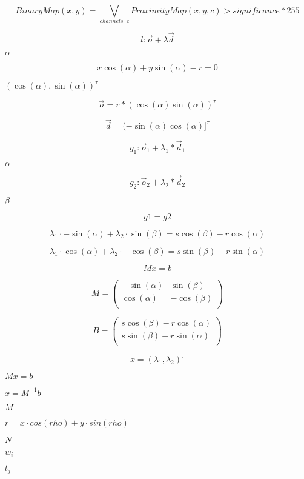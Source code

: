 \documentclass{article}
\begin{document}
\[ BinaryMap(x,y) = \bigvee\limits_{channels\;\; c} ProximityMap(x,y,c) > significance*255 \]
\pagebreak

\[ l: \vec{o}+\lambda \vec{d} \]
\pagebreak

$\alpha $
\pagebreak

\[ x \cos(\alpha) + y \sin(\alpha) - r = 0 \]
\pagebreak

$ (\cos(\alpha), \sin(\alpha) )^{\tau} $
\pagebreak

\[ \vec{o} = r * ( \cos(\alpha) \sin(\alpha) )^{\tau} \]
\pagebreak

\[ \vec{d} = ( -\sin(\alpha) \cos(\alpha) ]^{\tau} \]
\pagebreak

\[ g_1: \vec{o}_1+ \lambda_1 * \vec{d}_1 \]
\pagebreak

$\alpha$
\pagebreak

\[ g_2: \vec{o}_2+ \lambda_2 * \vec{d}_2 \]
\pagebreak

$\beta$
\pagebreak

\[ g1 = g2 \]
\pagebreak

\[ \lambda_1\cdot -\sin(\alpha) + \lambda_2 \cdot \sin(\beta) = s\cos(\beta) - r\cos(\alpha) \]
\pagebreak

\[ \lambda_1\cdot \cos(\alpha) + \lambda_2 \cdot -\cos(\beta) = s\sin(\beta) - r\sin(\alpha) \]
\pagebreak

\[ Mx = b \]
\pagebreak

\[ M = \left( \begin{array}{cc} -\sin(\alpha) & \sin(\beta) \\ \cos(\alpha) & -\cos(\beta) \\ \end{array} \right) \]
\pagebreak

\[ B = \left( \begin{array}{c} s\cos(\beta) - r\cos(\alpha) \\ s\sin(\beta) - r\sin(\alpha) \\ \end{array} \right) \]
\pagebreak

\[ x = (\lambda_1, \lambda_2)^{\tau} \]
\pagebreak

$ Mx=b $
\pagebreak

$x=M^{-1}b$
\pagebreak

$M$
\pagebreak

$r = x\cdot cos(rho) + y\cdot sin(rho)$
\pagebreak

$N$
\pagebreak

$w_i$
\pagebreak

$t_j$
\pagebreak
\end{document}
